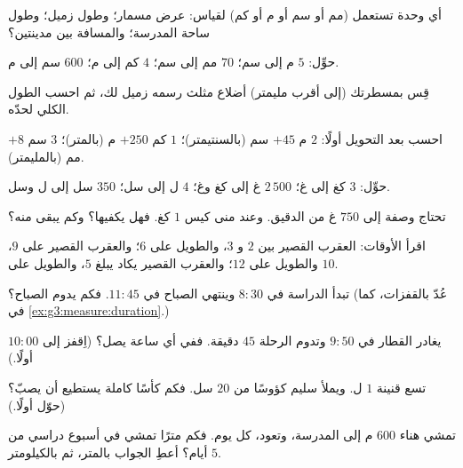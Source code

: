 \begin{exercise}[$\star$]\label{exo:g3:measure:1}
أي وحدة تستعمل (مم أو سم أو م أو كم) لقياس: عرض مسمار؛
وطول زميل؛ وطول ساحة المدرسة؛ والمسافة بين
مدينتين؟
\end{exercise}

\begin{exercise}[$\star$]\label{exo:g3:measure:2}
حوِّل: $5$ م إلى سم؛ \quad $70$ مم إلى سم؛ \quad $4$ كم إلى م؛
\quad $600$ سم إلى م.
\end{exercise}

\begin{exercise}[$\star$]\label{exo:g3:measure:3}
قِس بمسطرتك (إلى أقرب مليمتر) أضلاع مثلث رسمه زميل لك،
ثم احسب الطول الكلي لحدّه.
\end{exercise}

\begin{exercise}[$\star$]\label{exo:g3:measure:4}
احسب بعد التحويل أولًا: $2$ م $+ 45$ سم (بالسنتيمتر)؛ \quad
$1$ كم $+ 250$ م (بالمتر)؛ \quad $3$ سم $+ 8$ مم (بالمليمتر).
\end{exercise}

\begin{exercise}[$\star$]\label{exo:g3:measure:5}
حوِّل: $3$ كغ إلى غ؛ \quad $2\,500$ غ إلى كغ وغ؛ \quad
$4$ ل إلى سل؛ \quad $350$ سل إلى ل وسل.
\end{exercise}

\begin{exercise}[$\star$]\label{exo:g3:measure:6}
تحتاج وصفة إلى $750$ غ من الدقيق. وعند منى كيس $1$ كغ.
فهل يكفيها؟ وكم يبقى منه؟
\end{exercise}

\begin{exercise}[$\star$]\label{exo:g3:measure:7}
اقرأ الأوقات: العقرب القصير بين $2$ و $3$، والطويل
على $6$؛ والعقرب القصير على $9$، والطويل على $12$؛
والعقرب القصير يكاد يبلغ $5$، والطويل على $10$.
\end{exercise}

\begin{exercise}[$\star$]\label{exo:g3:measure:8}
تبدأ الدراسة في $8{:}30$ وينتهي الصباح في $11{:}45$. فكم يدوم
الصباح؟ (عُدّ بالقفزات، كما في
\cref{ex:g3:measure:duration}.)
\end{exercise}

\begin{exercise}[$\star$]\label{exo:g3:measure:9}
يغادر القطار في $9{:}50$ وتدوم الرحلة $45$ دقيقة. ففي أي
ساعة يصل؟ (اِقفز إلى $10{:}00$ أولًا.)
\end{exercise}

\begin{exercise}[$\star\star$]\label{exo:g3:measure:10}
تسع قنينة $1$ ل. ويملأ سليم كؤوسًا من $20$ سل. فكم كأسًا
كاملة يستطيع أن يصبّ؟ (حوّل أولًا.)
\end{exercise}

\begin{exercise}[$\star\star$]\label{exo:g3:measure:11}
تمشي هناء $600$ م إلى المدرسة، وتعود، كل يوم. فكم مترًا
تمشي في أسبوع دراسي من $5$ أيام؟ أعطِ الجواب بالمتر، ثم
بالكيلومتر.
\end{exercise}
